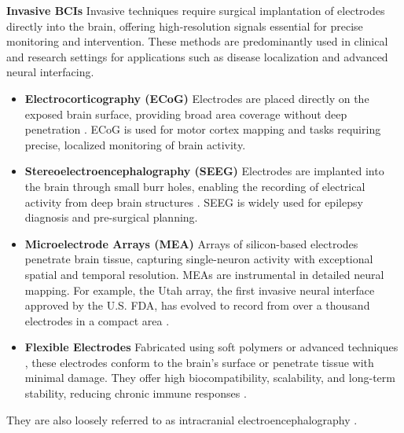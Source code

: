 \documentclass[journal]{IEEEtran}
\begin{document}
\textbf{Invasive BCIs} Invasive techniques require surgical implantation of electrodes directly into the brain, offering high-resolution signals essential for precise monitoring and intervention. These methods are predominantly used in clinical and research settings for applications such as disease localization and advanced neural interfacing.
\begin{itemize}
\item \textbf{Electrocorticography (ECoG)} Electrodes are placed directly on the exposed brain surface, providing broad area coverage without deep penetration \cite{Leuthardt2004}. ECoG is used for motor cortex mapping and tasks requiring precise, localized monitoring of brain activity.
\item \textbf{Stereoelectroencephalography (SEEG)} Electrodes are implanted into the brain through small burr holes, enabling the recording of electrical activity from deep brain structures \cite{Talairach1966}. SEEG is widely used for epilepsy diagnosis and pre-surgical planning.
\item \textbf{Microelectrode Arrays (MEA)} Arrays of silicon-based electrodes penetrate brain tissue, capturing single-neuron activity with exceptional spatial and temporal resolution. MEAs are instrumental in detailed neural mapping. For example, the Utah array, the first invasive neural interface approved by the U.S. FDA, has evolved to record from over a thousand electrodes in a compact area \cite{Schwartz2004}.
\item \textbf{Flexible Electrodes} Fabricated using soft polymers or advanced techniques \cite{Musk2019, Jiang2022, Tang2023, Wang2023a, Zhao2023, Zhang2023b, Dong2024, LeFloch2024}, these electrodes conform to the brain's surface or penetrate tissue with minimal damage. They offer high biocompatibility, scalability, and long-term stability, reducing chronic immune responses \cite{Lee2022}.
\end{itemize}

They are also loosely referred to as intracranial electroencephalography \cite{Parvizi2018}.
\end{document}

